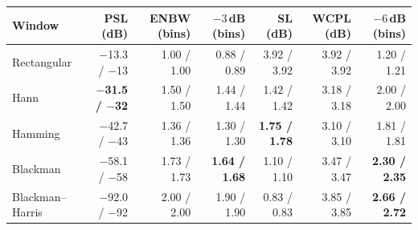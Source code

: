 \begin{tabular}{lrrrrrr}
\hline
Window & PSL (dB) & ENBW (bins) & $-3$\,dB (bins) & SL (dB) & WCPL (dB) & $-6$\,dB (bins) \\
\hline
Rectangular & $-$13.3 / $-$13 & 1.00 / 1.00 & 0.88 / 0.89 & 3.92 / 3.92 & 3.92 / 3.92 & 1.20 / 1.21 \\
Hann & \textbf{$-$31.5 / $-$32} & 1.50 / 1.50 & 1.44 / 1.44 & 1.42 / 1.42 & 3.18 / 3.18 & 2.00 / 2.00 \\
Hamming & $-$42.7 / $-$43 & 1.36 / 1.36 & 1.30 / 1.30 & \textbf{1.75 / 1.78} & 3.10 / 3.10 & 1.81 / 1.81 \\
Blackman & $-$58.1 / $-$58 & 1.73 / 1.73 & \textbf{1.64 / 1.68} & 1.10 / 1.10 & 3.47 / 3.47 & \textbf{2.30 / 2.35} \\
Blackman--Harris & $-$92.0 / $-$92 & 2.00 / 2.00 & 1.90 / 1.90 & 0.83 / 0.83 & 3.85 / 3.85 & \textbf{2.66 / 2.72} \\
\hline
\end{tabular}
